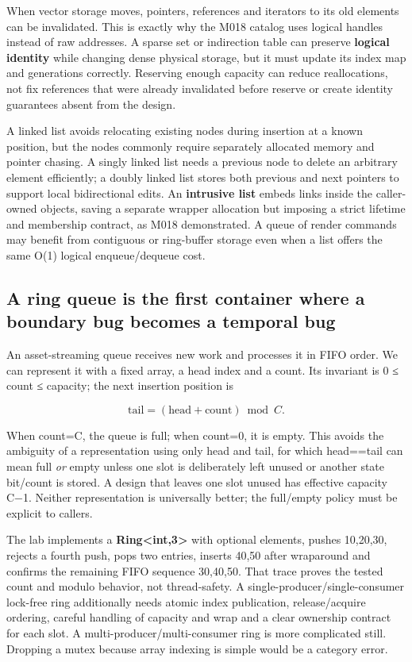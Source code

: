 When vector storage moves, pointers, references and iterators to its old elements can be invalidated. This is exactly why the M018 catalog uses logical handles instead of raw addresses. A sparse set or indirection table can preserve \textbf{logical identity} while changing dense physical storage, but it must update its index map and generations correctly. Reserving enough capacity can reduce reallocations, not fix references that were already invalidated before reserve or create identity guarantees absent from the design.

A linked list avoids relocating existing nodes during insertion at a known position, but the nodes commonly require separately allocated memory and pointer chasing. A singly linked list needs a previous node to delete an arbitrary element efficiently; a doubly linked list stores both previous and next pointers to support local bidirectional edits. An \textbf{intrusive list} embeds links inside the caller-owned objects, saving a separate wrapper allocation but imposing a strict lifetime and membership contract, as M018 demonstrated. A queue of render commands may benefit from contiguous or ring-buffer storage even when a list offers the same O(1) logical enqueue/dequeue cost.

\subsection{A ring queue is the first container where a boundary bug becomes a temporal bug}\label{01-foundations-i-ch007-a-ring-queue-is-the-first-container-where-a-boundary-bug-becomes-a-temporal-bug}

An asset-streaming queue receives new work and processes it in FIFO order. We can represent it with a fixed array, a head index and a count. Its invariant is 0 ≤ count ≤ capacity; the next insertion position is

\[
\mathrm{tail}=(\mathrm{head}+\mathrm{count})\bmod C.
\]

When count=C, the queue is full; when count=0, it is empty. This avoids the ambiguity of a representation using only head and tail, for which head==tail can mean full \emph{or} empty unless one slot is deliberately left unused or another state bit/count is stored. A design that leaves one slot unused has effective capacity C−1. Neither representation is universally better; the full/empty policy must be explicit to callers.

The lab implements a \textbf{Ring\textless int,3\textgreater{}} with optional elements, pushes 10,20,30, rejects a fourth push, pops two entries, inserts 40,50 after wraparound and confirms the remaining FIFO sequence 30,40,50. That trace proves the tested count and modulo behavior, not thread-safety. A single-producer/single-consumer lock-free ring additionally needs atomic index publication, release/acquire ordering, careful handling of capacity and wrap and a clear ownership contract for each slot. A multi-producer/multi-consumer ring is more complicated still. Dropping a mutex because array indexing is simple would be a category error.

